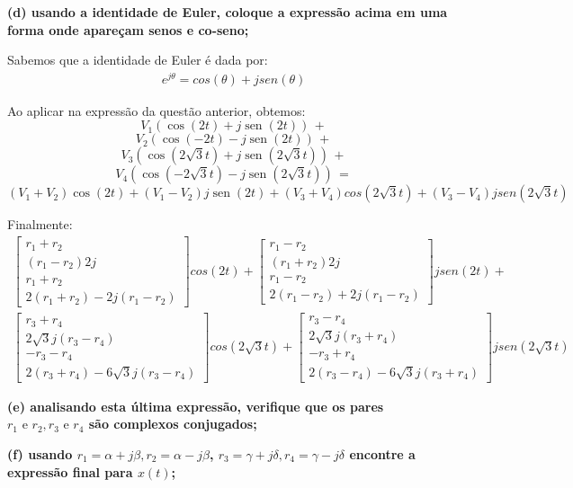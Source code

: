 \documentclass[11pt]{article}
\DeclareMathOperator{\sen}{sen}
\begin{document}
\textbf{(d) usando a identidade de Euler, coloque a expressão acima em uma forma onde apareçam senos e co-seno;}

Sabemos que a identidade de Euler é dada por:
\begin{align*}
  e^{j\theta} = cos(\theta) + jsen(\theta)
\end{align*}

Ao aplicar na expressão da questão anterior, obtemos:
\[V_1(\cos(2t)+j\sen(2t)) \, +\]
\[V_2(\cos(-2t)-j\sen(2t)) \, +\]
\[V_3(\cos(2\sqrt{3}t)+j\sen(2\sqrt{3}t)) \, +\]
\[V_4(\cos(-2\sqrt{3}t)-j\sen(2\sqrt{3}t)) \, =\]
\[(V_1+V_2)\cos(2t) + (V_1-V_2)j\sen(2t) + (V_3+V_4)cos(2\sqrt{3}t) + (V_3-V_4)jsen(2\sqrt{3}t)\]

Finalmente:
\begin{align*}
  \begin{bmatrix}
    r_1+r_2\\
    (r_1-r_2)2j\\
    r_1+r_2\\
    2(r_1+r_2)-2j(r_1-r_2)
  \end{bmatrix}
  cos(2t) +
    \begin{bmatrix}
      r_1-r_2\\
      (r_1+r_2)2j\\
      r_1-r_2\\
      2(r_1-r_2)+2j(r_1-r_2)
    \end{bmatrix}
    jsen(2t) +\\
  \begin{bmatrix}
    r_3+r_4\\
    2\sqrt{3}j(r_3-r_4)\\
    -r_3-r_4\\
    2(r_3+r_4)-6\sqrt{3}j(r_3-r_4)
  \end{bmatrix}
  cos(2\sqrt{3}t) +
  \begin{bmatrix}
    r_3-r_4\\
    2\sqrt{3}j(r_3+r_4)\\
    -r_3+r_4\\
    2(r_3-r_4)-6\sqrt{3}j(r_3+r_4)
  \end{bmatrix}
  jsen(2\sqrt{3}t)
\end{align*}

\textbf{(e) analisando esta última expressão, verifique que os pares $r_1 \text{ e } r_2, r_3 \text{ e } r_4$ são complexos conjugados;}

\textbf{(f) usando $r_1 = \alpha + j\beta, r_2 = \alpha - j\beta$, $r_3 = \gamma + j\delta, r_4 = \gamma - j\delta$ encontre a expressão final para $x(t)$;}
\end{document}
